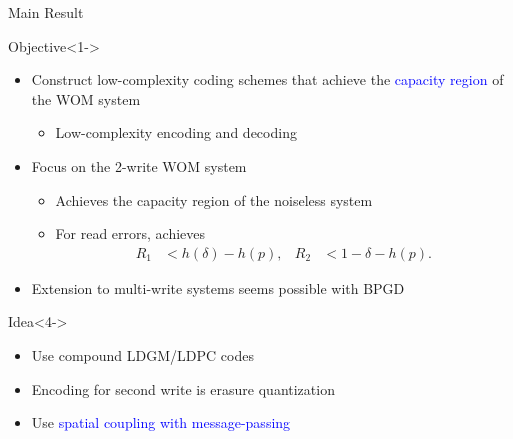 \documentclass[10pt,presentation]{beamer}
\begin{document}
\begin{frame}{Main Result}
  \begin{block}{Objective}<1->
    \begin{itemize}
    \item Construct \alert{low-complexity} coding schemes that achieve the \textcolor{blue}{capacity region} of the WOM system\vspace{0.1cm}
      \begin{itemize}
      \item<1-> Low-complexity encoding and decoding
      \end{itemize}
    \item<2-> Focus on the 2-write WOM system
      \begin{itemize}
      \item Achieves the capacity region of the noiseless system
      \item For read errors, achieves
        \begin{align*}
          R_1 &< h(\delta) - h(p), & R_2 &< 1 - \delta - h(p) .
        \end{align*}
      \end{itemize}
    \item<3-> Extension to multi-write systems \alert{seems possible with BPGD}
    \end{itemize}
  \end{block}
  \begin{block}{Idea}<4->
    \begin{itemize}
      \item Use compound LDGM/LDPC codes
      \item Encoding for second write is \alert{erasure quantization}
      \item Use \textcolor{blue}{spatial coupling with message-passing}
    \end{itemize}
  \end{block}
\end{frame}
\end{document}

